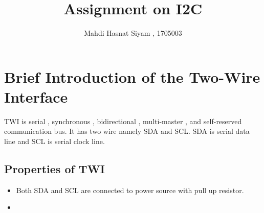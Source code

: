 \documentclass{article}
\title{Assignment on I2C}
\author{Mahdi Hasnat Siyam , 1705003}
\begin{document}
\maketitle


\section{Brief Introduction of the Two-Wire Interface}
TWI is serial , synchronous , bidirectional ,
multi-master , and self-reserved communication bus.
It has two wire namely SDA and SCL.
SDA is serial data line and SCL is serial clock line.
\subsection{Properties of TWI}
\begin{itemize}
	\item Both SDA and SCL are connected to power 
	source with pull up resistor.
	\item 
\end{itemize}
\end{document}
